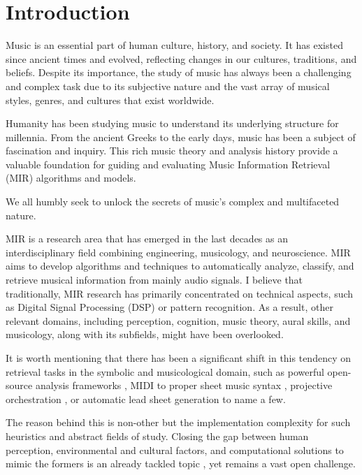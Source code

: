 \chapter{Introduction}

Music is an essential part of human culture, history, and society. It has existed since ancient times and evolved, reflecting changes in our cultures, traditions, and beliefs. Despite its importance, the study of music has always been a challenging and complex task due to its subjective nature and the vast array of musical styles, genres, and cultures that exist worldwide.

Humanity has been studying music to understand its underlying structure for millennia. From the ancient Greeks to the early days, music has been a subject of fascination and inquiry. This rich music theory and analysis history provide a valuable foundation for guiding and evaluating Music Information Retrieval (MIR) algorithms and models. 

We all humbly seek to unlock the secrets of music's complex and multifaceted nature.

MIR is a research area that has emerged in the last decades as an interdisciplinary field combining engineering, musicology, and neuroscience. MIR aims to develop algorithms and techniques to automatically analyze, classify, and retrieve musical information from mainly audio signals. I believe that traditionally, MIR research has primarily concentrated on technical aspects, such as Digital Signal Processing (DSP) or pattern recognition. As a result, other relevant domains, including perception, cognition, music theory, aural skills, and musicology, along with its subfields, might have been overlooked. 

It is worth mentioning that there has been a significant shift in this tendency on retrieval tasks in the symbolic and musicological domain, such as powerful open-source analysis frameworks \cite{ScottCuthbertChristopherArizaMusic21:Data}, MIDI to proper sheet music syntax \cite{Suzuki2021ScoreRepresentation}, projective orchestration \cite{Crestel2018AOrchestration}, or automatic lead sheet generation \cite{WeilAutomaticSignals} to name a few.

The reason behind this is non-other but the implementation complexity for such heuristics and abstract fields of study. Closing the gap between human perception, environmental and cultural factors, and computational solutions to mimic the formers is an already tackled topic \cite{Large1994ResonanceMeter}\cite{Mullensiefen2003MeasuringJudgments}\cite{Sears2014PerceivingCadence}\cite{Thaut2014HumanPatter}\cite{Hernandez-Olivan2023SymbolicMethods}, yet remains a vast open challenge.